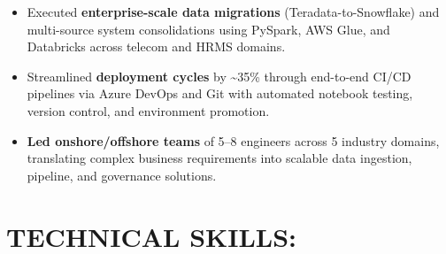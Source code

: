 \documentclass[a4paper,10pt]{article}
\begin{document}
\begin{itemize}
    \item Executed \textbf{enterprise-scale data migrations} (Teradata-to-Snowflake) and multi-source system consolidations using PySpark, AWS Glue, and Databricks across telecom and HRMS domains.
    \item Streamlined \textbf{deployment cycles} by \textasciitilde 35\% through end-to-end CI/CD pipelines via Azure DevOps and Git with automated notebook testing, version control, and environment promotion.
    \item \textbf{Led onshore/offshore teams} of 5--8 engineers across 5 industry domains, translating complex business requirements into scalable data ingestion, pipeline, and governance solutions.
\end{itemize}

\section*{TECHNICAL SKILLS:}
\renewcommand{\arraystretch}{1.15}
\end{document}
